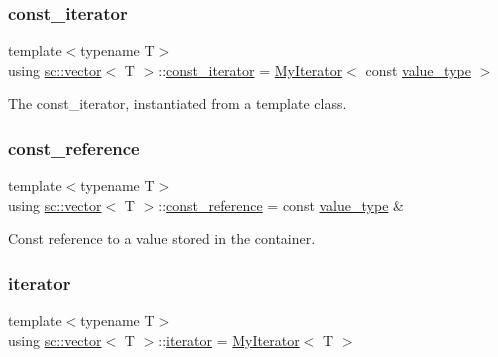 \subsubsection{\texorpdfstring{const\+\_\+iterator}{const\_iterator}}
{\footnotesize\ttfamily template$<$typename T$>$ \\
using \hyperlink{classsc_1_1vector}{sc\+::vector}$<$ T $>$\+::\hyperlink{classsc_1_1vector_a1e50aa429ea9de6ead4bfdb8614c1c9a}{const\+\_\+iterator} =  \hyperlink{classsc_1_1MyIterator}{My\+Iterator}$<$ const \hyperlink{classsc_1_1vector_ad37f5bfa688e43c420ed565e4bff6fac}{value\+\_\+type} $>$}



The const\+\_\+iterator, instantiated from a template class. 

\mbox{\label{classsc_1_1vector_a8da2b1a11b069241100f9b2e14f481a0}} 
\subsubsection{\texorpdfstring{const\+\_\+reference}{const\_reference}}
{\footnotesize\ttfamily template$<$typename T$>$ \\
using \hyperlink{classsc_1_1vector}{sc\+::vector}$<$ T $>$\+::\hyperlink{classsc_1_1vector_a8da2b1a11b069241100f9b2e14f481a0}{const\+\_\+reference} =  const \hyperlink{classsc_1_1vector_ad37f5bfa688e43c420ed565e4bff6fac}{value\+\_\+type} \&}



Const reference to a value stored in the container. 

\mbox{\label{classsc_1_1vector_a9e5d5cc35e379aa27a93989f4a71413c}} 
\subsubsection{\texorpdfstring{iterator}{iterator}}
{\footnotesize\ttfamily template$<$typename T$>$ \\
using \hyperlink{classsc_1_1vector}{sc\+::vector}$<$ T $>$\+::\hyperlink{classsc_1_1vector_a9e5d5cc35e379aa27a93989f4a71413c}{iterator} =  \hyperlink{classsc_1_1MyIterator}{My\+Iterator}$<$ T $>$}



